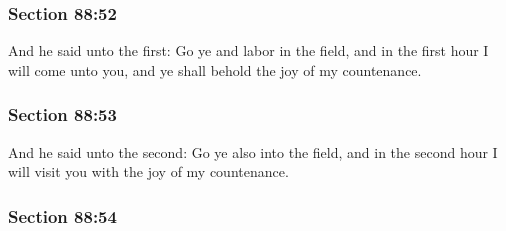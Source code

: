 
	\subsubsection{Section 88:52} %
		\label{DC88-52}

		And he said unto the first: Go ye and labor in the field, and in the first hour I will come unto you, and ye shall behold the joy of my countenance.


	\subsubsection{Section 88:53} %
		\label{DC88-53}

		And he said unto the second: Go ye also into the field, and in the second hour I will visit you with the joy of my countenance.


	\subsubsection{Section 88:54} %
		\label{DC88-54}

